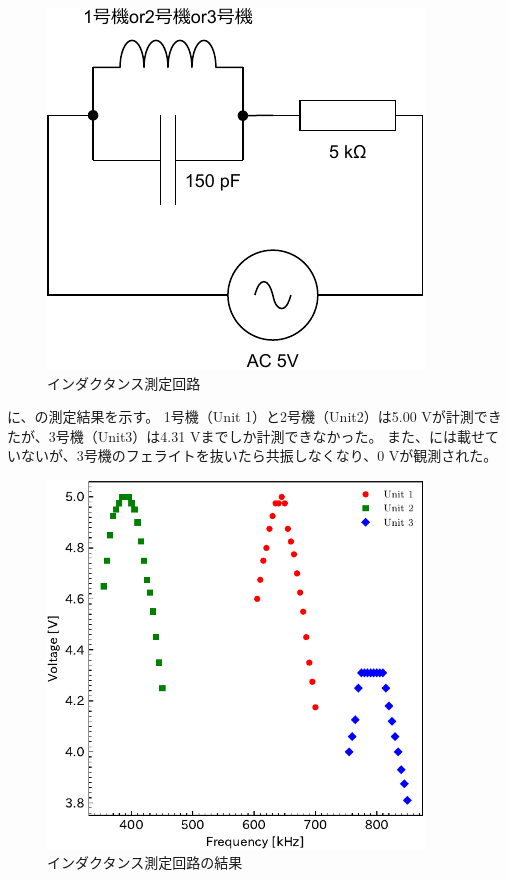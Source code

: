 \documentclass[report.tex]{subfiles}
\begin{document}
\begin{figure}[H]
	\centering
	\includegraphics[width=10cm]{fig/inda.pdf}
	\caption{インダクタンス測定回路}
	\label{fig:inda}
\end{figure}

に、の測定結果を示す。
1号機（Unit 1）と2号機（Unit2）は5.00 Vが計測できたが、3号機（Unit3）は4.31 Vまでしか計測できなかった。
また、には載せていないが、3号機のフェライトを抜いたら共振しなくなり、0 Vが観測された。

\begin{figure}[H]
	\centering
	\includegraphics[width=10cm]{fig/1_kyo.pdf}
	\caption{インダクタンス測定回路の結果}
	\label{fig:inda2}
\end{figure}
\end{document}
